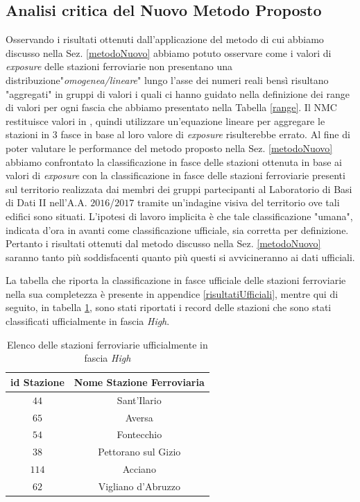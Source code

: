 \subsection{Analisi critica del Nuovo Metodo Proposto}
\label{analisicritica}
Osservando i risultati ottenuti dall'applicazione del metodo di cui abbiamo discusso nella Sez. \ref{metodoNuovo} abbiamo potuto osservare come i valori di \textit{exposure} delle stazioni ferroviarie non presentano una distribuzione\newline "\textit{omogenea/lineare}" lungo l'asse dei numeri reali bensì risultano "aggregati" in gruppi di valori i quali ci hanno guidato nella definizione dei range di valori per ogni fascia che abbiamo presentato nella Tabella \ref{range}.
Il NMC restituisce valori in , quindi utilizzare un'equazione lineare per aggregare le stazioni in $3$ fasce in base al loro valore di \textit{exposure} risulterebbe errato.
Al fine di poter valutare le performance del metodo proposto nella Sez. \ref{metodoNuovo} abbiamo confrontato la classificazione in fasce delle stazioni ottenuta in base ai valori di \textit{exposure} con la classificazione in fasce delle stazioni ferroviarie presenti sul territorio realizzata dai membri dei gruppi partecipanti al Laboratorio di Basi di Dati II nell'A.A. $2016$/$2017$ tramite un'indagine visiva del territorio ove tali edifici sono situati. L'ipotesi di lavoro implicita è che tale classificazione "umana", indicata d'ora in avanti come classificazione ufficiale, sia corretta per definizione. Pertanto i risultati ottenuti dal metodo discusso nella Sez. \ref{metodoNuovo} saranno tanto più soddisfacenti quanto più questi si avvicineranno ai dati ufficiali.

La tabella che riporta la classificazione in fasce ufficiale delle stazioni ferroviarie nella sua completezza è presente in appendice \ref{risultatiUfficiali}, mentre qui di seguito, in tabella \ref{fasciaHighUfficiale}, sono stati riportati i record delle stazioni che sono stati classificati ufficialmente in fascia \textit{High}.
\begin{table}[h]
\centering
\begin{tabular}{|c|c|}
\hline
\rowcolor{lightgray}
\textbf{id Stazione} & \textbf{Nome Stazione Ferroviaria} \\
\hline
\rowcolor{flamingopink}
$44$ & Sant'Ilario \\
\hline
\rowcolor{flamingopink}
$65$ & Aversa \\\hline
\rowcolor{flamingopink}
$54$ & Fontecchio \\\hline
\rowcolor{flamingopink}
$38$ & Pettorano sul Gizio \\\hline
\rowcolor{flamingopink}
$114$ & Acciano \\\hline
\rowcolor{flamingopink}
$62$ & Vigliano d'Abruzzo \\
\hline
\end{tabular}
\caption{Elenco delle stazioni ferroviarie ufficialmente in fascia \textit{High}}
\label{fasciaHighUfficiale}
\end{table}

